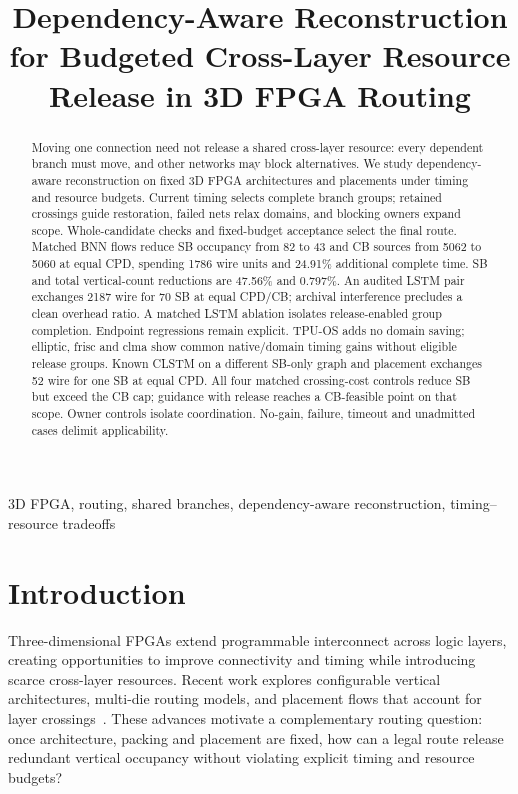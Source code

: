 \documentclass[conference,10pt]{IEEEtran}
\title{Dependency-Aware Reconstruction for Budgeted Cross-Layer Resource Release in 3D FPGA Routing}
\author{\IEEEauthorblockN{Anonymous submission}}
\begin{document}
\maketitle
\begin{abstract}
Moving one connection need not release a shared cross-layer resource: every dependent branch must move, and other networks may block alternatives. We study dependency-aware reconstruction on fixed 3D FPGA architectures and placements under timing and resource budgets. Current timing selects complete branch groups; retained crossings guide restoration, failed nets relax domains, and blocking owners expand scope. Whole-candidate checks and fixed-budget acceptance select the final route. Matched BNN flows reduce SB occupancy from 82 to 43 and CB sources from 5062 to 5060 at equal CPD, spending 1786 wire units and 24.91\% additional complete time. SB and total vertical-count reductions are 47.56\% and 0.797\%. An audited LSTM pair exchanges 2187 wire for 70 SB at equal CPD/CB; archival interference precludes a clean overhead ratio. A matched LSTM ablation isolates release-enabled group completion. Endpoint regressions remain explicit. TPU-OS adds no domain saving; elliptic, frisc and clma show common native/domain timing gains without eligible release groups. Known CLSTM on a different SB-only graph and placement exchanges 52 wire for one SB at equal CPD. All four matched crossing-cost controls reduce SB but exceed the CB cap; guidance with release reaches a CB-feasible point on that scope. Owner controls isolate coordination. No-gain, failure, timeout and unadmitted cases delimit applicability.
\end{abstract}
\begin{IEEEkeywords}
3D FPGA, routing, shared branches, dependency-aware reconstruction, timing--resource tradeoffs
\end{IEEEkeywords}

\section{Introduction}
Three-dimensional FPGAs extend programmable interconnect across logic layers, creating opportunities to improve connectivity and timing while introducing scarce cross-layer resources. Recent work explores configurable vertical architectures, multi-die routing models, and placement flows that account for layer crossings~\cite{lazagna,multidie,flatland}. These advances motivate a complementary routing question: once architecture, packing and placement are fixed, how can a legal route release redundant vertical occupancy without violating explicit timing and resource budgets?
\end{document}
